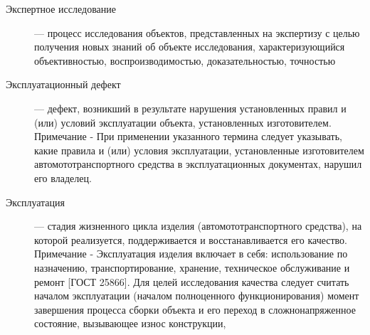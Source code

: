 \begin{description}
	\item[Экспертное исследование] --- процесс исследования объектов, представленных на экспертизу с целью получения новых знаний об объекте исследования, характеризующийся объективностью, воспроизводимостью, доказательностью, точностью \cite[п.3.74]{58197:gost} 
	
%	
	
	
	
	\item[Эксплуатационный дефект] --- дефект, возникший в результате нарушения установленных правил и (или) условий эксплуатации объекта, установленных изготовителем. Примечание - При применении указанного термина следует указывать, какие правила и (или) условия эксплуатации, установленные изготовителем автомототранспортного средства в эксплуатационных документах, нарушил его владелец. \cite[п.76]{58197:gost} 
	
	\item[Эксплуатация] --- стадия жизненного цикла изделия (автомототранспортного средства), на которой реализуется, поддерживается и восстанавливается его качество. Примечание - Эксплуатация изделия включает в себя: использование по назначению, транспортирование, хранение, техническое обслуживание и ремонт [ГОСТ 25866]. Для целей исследования качества следует считать началом эксплуатации (началом полноценного функционирования) момент завершения процесса сборки объекта и его переход в сложнонапряженное состояние, вызывающее износ конструкции, \cite[п.3.77]{58197:gost} 
	

\end{description}
